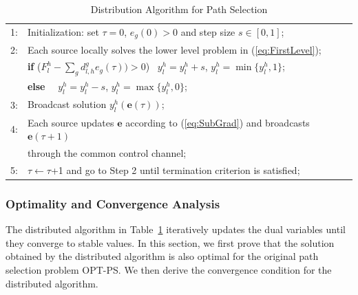 \documentclass[12pt,onecolumn,draftclsnofoot]{IEEEtran} %
\begin{document}
\begin{table}[!t]
\begin{center}
\caption{Distribution Algorithm for Path Selection}
\begin{tabular}{ll}
\hline
1: & Initialization: set $\tau=0$, $e_g(0) >0 $ and step size $s \in [0,1]$; \\ 
2: & Each source locally solves the lower level problem in (\ref{eq:FirstLevel}); \\
   & {\bf if} ($F_l^h-\sum_g d_{l,h}^g e_g(\tau)) > 0$) \ $y_l^h=y_l^h+s$, $y_l^h= \min \{y_l^h,1\}$;\\ 
   & {\bf else} \ \ $y_l^h=y_l^h-s$, $y_l^h=\max\{y_l^h,0\}$; \\
3: & Broadcast solution $y_l^h(\mathbf{e}(\tau))$; \\
4: & Each source updates $\mathbf{e}$ according to (\ref{eq:SubGrad}) and broadcasts 
        $\mathbf{e}(\tau+1)$ \\
   & through the common control channel; \\
5: & $\tau \leftarrow \tau$+1 and go to Step 2 until termination criterion is satisfied;
   \\ \hline
\end{tabular}
\label{tab:PathSelecAlgo}
\end{center}
\end{table}


\subsubsection{Optimality and Convergence Analysis} 

The distributed algorithm in Table~\ref{tab:PathSelecAlgo} iteratively updates the dual variables until they converge to stable values.  In this section, we first prove that the solution obtained by the distributed algorithm is also optimal for the original path selection problem OPT-PS.  We then derive the convergence condition for the distributed algorithm. 
\end{document}
